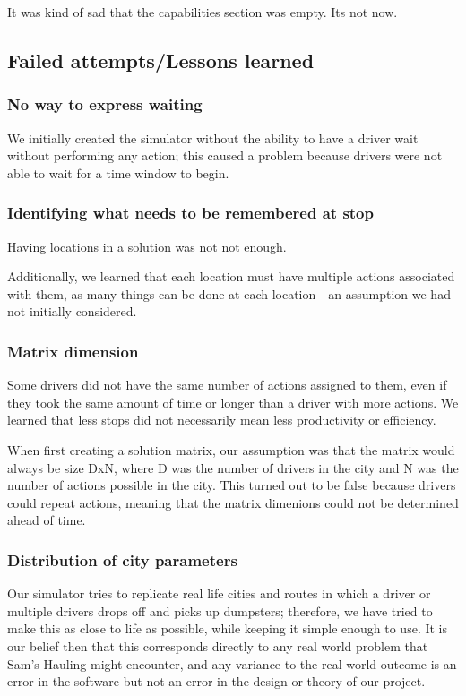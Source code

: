 \documentclass{article}
\begin{document}
It was kind of sad that the capabilities section was empty.
Its not now.


\subsection{Failed attempts/Lessons learned}


\subsubsection{No way to express waiting}

We initially created the simulator without the ability to have a driver wait without performing any action;
this caused a problem because drivers were not able to wait for a time window to begin.  


\subsubsection{Identifying what needs to be remembered at stop}
Having locations in a solution was not not enough.

Additionally, we learned that each location must have multiple actions associated with them, 
as many things can be done at each location - an assumption we had not initially considered.


\subsubsection{Matrix dimension}
Some drivers did not have the same number of actions assigned to them, even if they took the same amount of time or longer than a driver with more actions.
We learned that less stops did not necessarily mean less productivity or efficiency.

When first creating a solution matrix, our assumption was that the matrix would always be size DxN, where D was the number of drivers in the city and N was the number of actions possible in the city. 
This turned out to be false because drivers could repeat actions, meaning that the matrix dimenions could not be determined ahead of time.


\subsubsection{Distribution of city parameters}

Our simulator tries to replicate real life cities and routes in which a driver or multiple drivers drops off and picks up dumpsters;
therefore, we have tried to make this as close to life as possible, while keeping it simple enough to use.
It is our belief then that this corresponds directly to any real world problem that Sam's Hauling might encounter,
and any variance to the real world outcome is an error in the software but not an error in the design or theory of our project.
\end{document}
